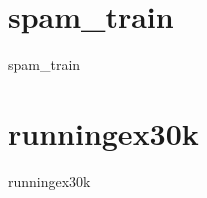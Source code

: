 \section{spam\_train}
\label{sec:dataSets:spam_train}
\begin{dataSetDescription}{spam_train}
\end{dataSetDescription}

\section{runningex30k}
\label{sec:dataSets:runningex30k}
\begin{dataSetDescription}{runningex30k}
\end{dataSetDescription}

